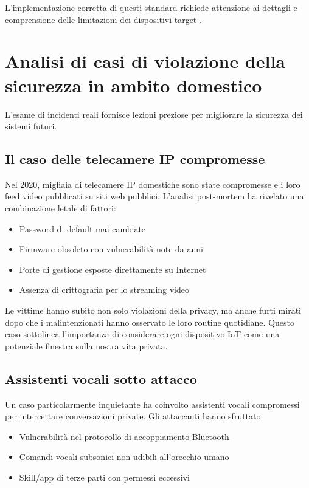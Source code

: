 L'implementazione corretta di questi standard richiede attenzione ai dettagli e comprensione delle limitazioni dei dispositivi target \parencite{sicari2015, yang2017}.

\section{Analisi di casi di violazione della sicurezza in ambito domestico}

L'esame di incidenti reali fornisce lezioni preziose per migliorare la sicurezza dei sistemi futuri.

\subsection{Il caso delle telecamere IP compromesse}

Nel 2020, migliaia di telecamere IP domestiche sono state compromesse e i loro feed video pubblicati su siti web pubblici. L'analisi post-mortem ha rivelato una combinazione letale di fattori:

\begin{itemize}
    \item Password di default mai cambiate
    \item Firmware obsoleto con vulnerabilità note da anni
    \item Porte di gestione esposte direttamente su Internet
    \item Assenza di crittografia per lo streaming video
\end{itemize}

Le vittime hanno subito non solo violazioni della privacy, ma anche furti mirati dopo che i malintenzionati hanno osservato le loro routine quotidiane. Questo caso sottolinea l'importanza di considerare ogni dispositivo IoT come una potenziale finestra sulla nostra vita privata.

\subsection{Assistenti vocali sotto attacco}

Un caso particolarmente inquietante ha coinvolto assistenti vocali compromessi per intercettare conversazioni private. Gli attaccanti hanno sfruttato:

\begin{itemize}
    \item Vulnerabilità nel protocollo di accoppiamento Bluetooth
    \item Comandi vocali subsonici non udibili all'orecchio umano
    \item Skill/app di terze parti con permessi eccessivi
\end{itemize}


